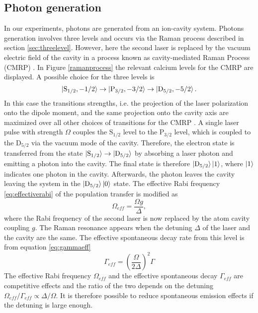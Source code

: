 \subsection{Photon generation}
\label{sec:ramanprocess}
In our experiments, photons are generated from an ion-cavity system. Photons generation involves three levels and occurs via the Raman process described in section \ref{sec:threelevel}. However, here the second laser is replaced by the vacuum electric field of the cavity in a process known as cavity-mediated Raman Process (CMRP) \cite{stuteinterface}. In Figure \ref{ramanprocess} the relevant calcium levels for the CMRP are displayed. A possible choice for the three levels is
\begin{equation}
\ket{\text{S}_{1/2},-1/2}\to\ket{\text{P}_{3/2},-3/2} \to \ket{\text{D}_{5/2},-5/2}.
\end{equation}
In this case the transitions strengths, i.e. the projection of the laser polarization onto the dipole moment, and the same projection onto the cavity axis are maximized over all other choices of transitions for the CMRP \cite{stuteinterface}. A single laser pulse with strength $\Omega$ couples the $\text{S}_{1/2}$ level to the $\text{P}_{3/2}$ level, which is coupled to the $\text{D}_{5/2}$ via the vacuum mode of the cavity. Therefore, the electron state is transferred from the state $\ket{\text{S}_{1/2}} \to \ket{\text{D}_{5/2}}$  by absorbing a laser photon and emitting a photon into the cavity. The final state is therefore $\ket{\text{D}_{5/2}}\ket{1}$, where $\ket{1}$ indicates one photon in the cavity. Afterwards, the photon leaves the cavity leaving the system in the $\ket{\text{D}_{5/2}}\ket{0}$ state. The effective Rabi frequency \eqref{eq:effectiverabi} of the population transfer is modified as \cite{Barros2009}
\begin{equation}
\label{omegaeff}
\Omega_{eff} = \frac{\Omega g}{\Delta},
\end{equation}
where the Rabi frequency of the second laser is now replaced by the atom cavity coupling $g$. The Raman resonance appears when the detuning $\Delta$ of the laser and the cavity are the same. The effective spontaneous decay rate from this level is from equation \eqref{eq:gammaeff}
\begin{equation}
\Gamma_{eff} = \left(\frac{\Omega}{2\Delta}\right)^2\Gamma
\end{equation}
The effective Rabi frequency $\Omega_{eff}$ and the effective spontaneous decay $\Gamma_{eff}$ are competitive effects and the ratio of the two depends on the detuning $\Omega_{eff}/\Gamma_{eff} \propto \Delta/\Omega$. It is therefore possible to reduce spontaneous emission effects if the detuning is large enough.\\
